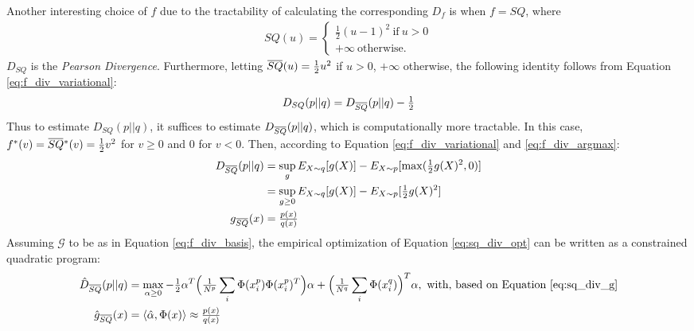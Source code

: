 \documentclass[8pt]{article}
\newcommand{\overbar}[1]{\mkern 1.0mu\overline{\mkern-1.0mu#1\mkern-1.0mu}\mkern 1.0mu}
\begin{document}
Another interesting choice of $f$ due to the tractability of
calculating the corresponding $D_f$ is when $f=SQ$, where
\begin{align}
SQ(u) = 
\begin{cases}
\tfrac{1}{2}(u-1)^2\ \text{if}\ u>0\\
+\infty\ \text{otherwise.}
\end{cases}
\end{align}
$D_{SQ}$ is the \emph{Pearson Divergence}.  Furthermore, letting
$\overbar{SQ}(u)=\tfrac{1}{2}u^2$ if $u>0$, $+\infty$ otherwise, the following
identity follows from Equation \ref{eq:f_div_variational}:
\begin{align}
D_{SQ}(p||q) = D_{\overbar{SQ}}(p||q) - \tfrac{1}{2} \label{eq:sq_identity}
\end{align}
Thus to estimate $D_{SQ}(p||q)$, it suffices to
estimate $D_{\overbar{SQ}}(p||q)$, which is computationally more tractable.
In this case, $f^*(v) = \overbar{SQ}^*(v)=\tfrac{1}{2}v^2$ for $v\geq 0$ and
$0$ for $v< 0$.  Then, according to Equation
\ref{eq:f_div_variational} and \ref{eq:f_div_argmax}:
\begin{align}
D_{\overbar{SQ}}(p||q) &= \sup_{g} E_{X\sim q}[g(X)] - E_{X\sim
  p}[\max(\tfrac{1}{2}g(X)^2,0)]\\
&= \sup_{g\geq 0} E_{X\sim q}[g(X)] - E_{X\sim
  p}[\tfrac{1}{2}g(X)^2]\label{eq:sq_div_opt}\\
g_{\overbar{SQ}}(x) &= \tfrac{p(x)}{q(x)}\label{eq:sq_div_g}
\end{align}
Assuming $\mathcal{G}$ to be as in Equation
\ref{eq:f_div_basis}, the empirical optimization of Equation
\ref{eq:sq_div_opt} can be written as a constrained quadratic program:
\begin{align}
\hat{D}_{\overbar{SQ}}(p||q)& = \max_{\alpha \geq 0}-\tfrac{1}{2}\alpha^T\Big(\tfrac{1}{N^p}\sum_i
\Phi(x_i^p)\Phi(x_i^p)^T\Big)\alpha +
\Big(\tfrac{1}{N^q}\sum_i\Phi(x_i^q)\Big)^T\alpha,\ \text{with, based
  on Equation \ref{eq:sq_div_g}}\label{eq:sq_div_estimation}\\
\hat{g}_{\overbar{SQ}}(x)&=\langle \hat{\alpha},\Phi(x)\rangle \approx \tfrac{p(x)}{q(x)}
\end{align}
\end{document}
